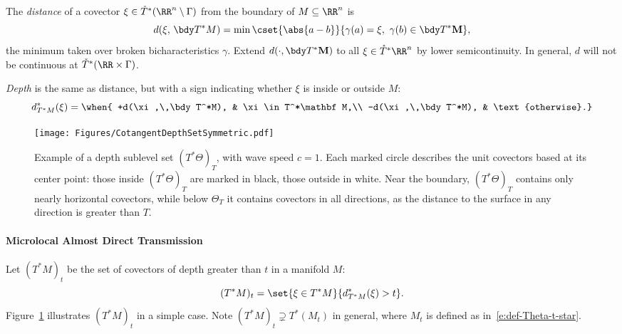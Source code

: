 \documentclass[10pt]{article}
\theoremstyle{plain}
\theoremstyle{definition}
\theoremstyle{remark}
\numberwithin{theorem}{section}
\numberwithin{example}{section}
\numberwithin{equation}{section}
\numberwithin{figure}{section}
\newcommand\To{\smash{\mathring T}\vphantom{T}}			%
\begin{document}
The \emph{distance} of a covector $\xi\in\To^*(\RR^n\setminus\Gamma)$ from the boundary of $M\subseteq\RR^n$ is
\begin{equation}
	d(\xi,\,\bdy T^*M) = \min \cset{\abs{a-b}}{\gamma(a) = \xi,\ \gamma(b)\in\bdy T^*\mathbf M},
\end{equation}
the minimum taken over broken bicharacteristics $\gamma$. Extend $d(\cdot,\bdy T^*\mathbf M)$ to all $\xi\in\To^*\RR^n$ by lower semicontinuity. In general, $d$ will not be continuous at $\To^*(\RR\times\Gamma)$.

\emph{Depth} is the same as distance, but with a sign indicating whether $\xi$ is inside or outside $M$:
\begin{equation}
	d^*_{T^*M}(\xi) = \when{
		+d(\xi,\,\bdy T^*M), &		\xi\in T^*\mathbf M,\\
		-d(\xi,\,\bdy T^*M), &			\text{otherwise}.%
	}
\end{equation}
%
%
\begin{figure}[p]
	\centering
	\texttt{[image: Figures/CotangentDepthSetSymmetric.pdf]}
	
	\caption{Example of a depth sublevel set $(T^*\Theta)_T$, with wave speed $c=1$. Each marked circle describes the unit covectors based at its center point: those inside $(T^*\Theta)_T$ are marked in black, those outside in white. Near the boundary, $(T^*\Theta)_T$ contains only nearly horizontal covectors, while below $\Theta_T$ it contains covectors in all directions, as the distance to the surface in any direction is greater than $T$.}
	\label{f:ml-depth-set}
\end{figure}%
%
%

\paragraph{Microlocal Almost Direct Transmission}

Let $(T^*M)_t$ be the set of covectors of depth greater than $t$ in a manifold $M$:
\begin{equation}
	(T^*M)_t = \set{\xi\in T^*M}{d^*_{T^*M}(\xi)>t}.
\end{equation}
Figure~\ref{f:ml-depth-set} illustrates $(T^*M)_t$ in a simple case. Note $(T^*M)_t\supsetneq T^*(M_t)$ in general, where $M_t$ is defined as in~\eqref{e:def-Theta-t-star}.
\end{document}
